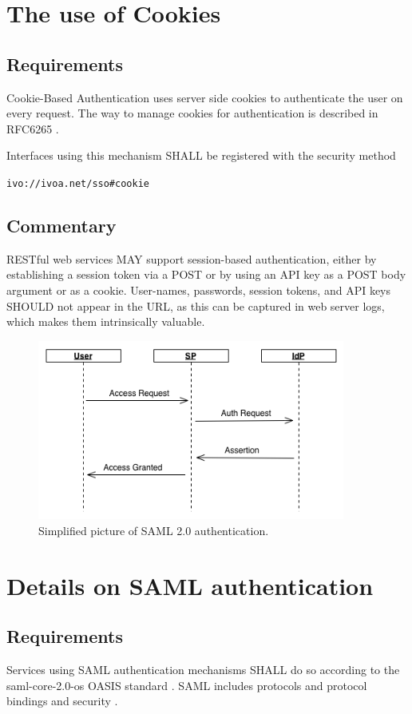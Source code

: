 \documentclass[11pt,a4paper]{ivoa}
\begin{document}
\section{The use of Cookies}
\subsection{Requirements}
Cookie-Based Authentication uses server side cookies to authenticate the user on every request. 
The way to manage  cookies for authentication is described in RFC6265 \citep{std:RFC6265}.

Interfaces using this mechanism SHALL  be registered with the security method 

\texttt{ivo://ivoa.net/sso\#cookie}


\subsection{Commentary}
RESTful web services MAY support  session-based authentication, either by establishing a session token via a POST or
by using an API key as a POST body argument or as a cookie. 
User-names, passwords, session tokens, and API keys SHOULD not appear in the URL, 
as this can be captured in web server logs, which makes them intrinsically valuable.
\begin{figure}
\centering
\includegraphics[width=0.9\textwidth]{SSO_image002.png}
\caption{Simplified picture of SAML 2.0 authentication.}
\label{fig:saml}
\end{figure}

\section{Details on SAML authentication}
\subsection{Requirements}
Services using SAML authentication mechanisms SHALL do so according to the 
saml-core-2.0-os OASIS standard \citep{std:SAML}. 
SAML includes protocols and protocol bindings and security \citep{std:SAMLB}.
\end{document}
